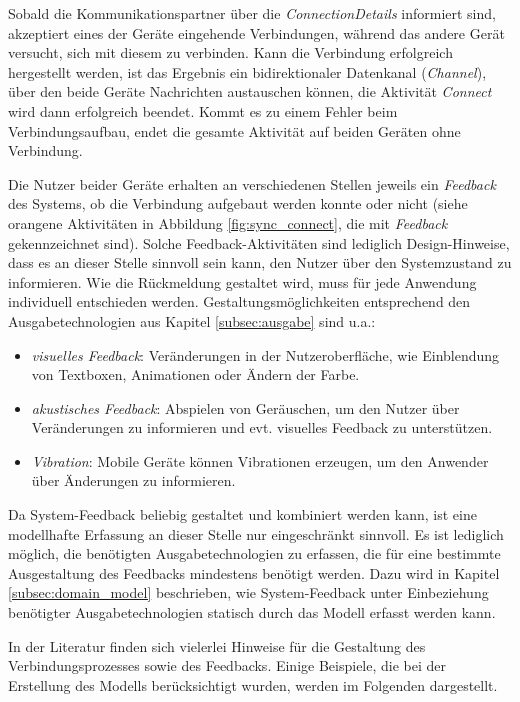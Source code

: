 Sobald die Kommunikationspartner über die \textit{ConnectionDetails} informiert sind, akzeptiert eines der Geräte eingehende Verbindungen, während das andere Gerät versucht, sich mit diesem zu verbinden. Kann die Verbindung erfolgreich hergestellt werden, ist das Ergebnis ein bidirektionaler Datenkanal (\textit{Channel}), über den beide Geräte Nachrichten austauschen können, die Aktivität \textit{Connect} wird dann erfolgreich beendet. Kommt es zu einem Fehler beim Verbindungsaufbau, endet die gesamte Aktivität auf beiden Geräten ohne Verbindung.

Die Nutzer beider Geräte erhalten an verschiedenen Stellen jeweils ein \textit{Feedback} des Systems, ob die Verbindung aufgebaut werden konnte oder nicht (siehe orangene Aktivitäten in Abbildung \ref{fig:sync_connect}, die mit \textit{Feedback} gekennzeichnet sind). Solche Feedback-Aktivitäten sind lediglich Design-Hinweise, dass es an dieser Stelle sinnvoll sein kann, den Nutzer über den Systemzustand zu informieren. Wie die Rückmeldung gestaltet wird, muss für jede Anwendung individuell entschieden werden. Gestaltungsmöglichkeiten entsprechend den Ausgabetechnologien aus Kapitel \ref{subsec:ausgabe} sind u.a.:
\begin{itemize}
\item \textit{visuelles Feedback}: Veränderungen in der Nutzeroberfläche, wie \zb Einblendung von Textboxen, Animationen oder Ändern der Farbe.
\item \textit{akustisches Feedback}: Abspielen von Geräuschen, um den Nutzer über Veränderungen zu informieren und evt. visuelles Feedback zu unterstützen.
\item \textit{Vibration}: Mobile Geräte können Vibrationen erzeugen, um den Anwender über Änderungen zu informieren.
\end{itemize}
Da System-Feedback beliebig gestaltet und kombiniert werden kann, ist eine modellhafte Erfassung an dieser Stelle nur eingeschränkt sinnvoll. Es ist lediglich möglich, die benötigten Ausgabetechnologien zu erfassen, die für eine bestimmte Ausgestaltung des Feedbacks mindestens benötigt werden. Dazu wird in Kapitel \ref{subsec:domain_model} beschrieben, wie System-Feedback unter Einbeziehung benötigter Ausgabetechnologien statisch durch das Modell erfasst werden kann.

In der Literatur finden sich vielerlei Hinweise für die Gestaltung des Verbindungsprozesses sowie des Feedbacks. Einige Beispiele, die bei der Erstellung des Modells berücksichtigt wurden, werden im Folgenden dargestellt.

